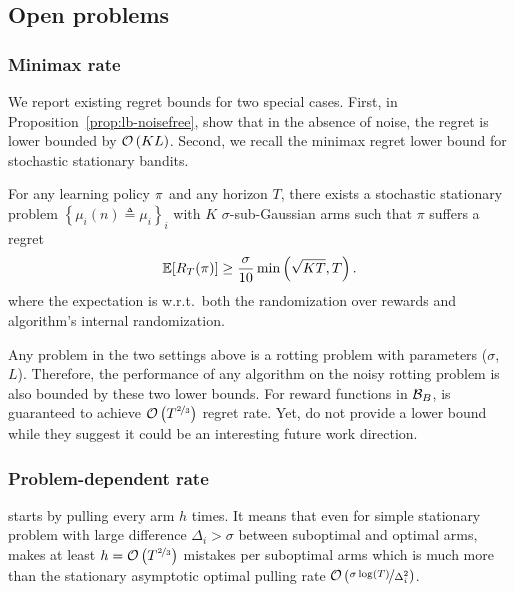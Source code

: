\subsection{Open problems}
\label{subsec:rested-open}
\subsubsection{Minimax rate}
We report existing regret bounds for two special cases. First, in Proposition~\ref{prop:lb-noisefree}, \citet{heidari2016tight} show that in the absence of noise, the regret is lower bounded by $\mathcal{O}\left(KL\right)$. Second, we recall the minimax regret lower bound for stochastic stationary bandits.

\begin{proposition}
\label{stochastic-LB}
For any learning policy $\pi$ and any horizon $T$, there exists a stochastic stationary problem $\left\{ \mu_i (n) \triangleq \mu_i\right\}_i$ with $K$ $\sigma$-sub-Gaussian arms such that $\pi$ suffers a regret
\begin{equation*}
 \mathbb{E}[R_T(\pi)] \geq \frac{\sigma}{10}\min\left(\sqrt{KT},T\right).
\end{equation*}
where the expectation is w.r.t.\ both the randomization
over rewards and algorithm's internal randomization.
\end{proposition}

Any problem in the two settings above is a rotting problem with parameters ($\sigma$, $L$). Therefore, the performance of any algorithm on the noisy rotting problem is also bounded by these two lower bounds. For reward functions in $\mathcal{B}_{B}$, \SWA is guaranteed to achieve $\mathcal{O}\left(T^{\nicefrac{2}{3}}\right)$ regret rate. Yet, \citet{levine2017rotting} do not provide a lower bound while they suggest it could be an interesting future work direction.

\subsubsection{Problem-dependent rate}
\SWA starts by pulling every arm $h$ times. It means that even for simple stationary problem with large difference $\Delta_i > \sigma$ between suboptimal and optimal arms, \SWA makes at least $h = \mathcal{O}\left(T^{\nicefrac{2}{3}}\right)$ mistakes per suboptimal arms which is much more than the stationary asymptotic optimal pulling rate $\mathcal{O}\left(\nicefrac{\sigma\log\left(T\right)}{\Delta_i^2}\right)$.


